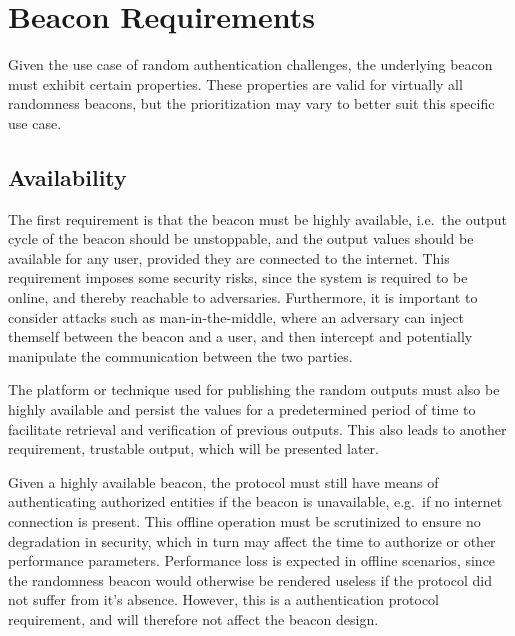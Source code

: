 \section{Beacon Requirements}
\label{sec:beacon_requirements}

Given the use case of random authentication challenges, the underlying beacon must exhibit certain properties.
These properties are valid for virtually all randomness beacons, but the prioritization may vary to better suit this specific use case.

\subsection{Availability}
The first requirement is that the beacon must be highly available, i.e.\ the output cycle of the beacon should be unstoppable,
and the output values should be available for any user, provided they are connected to the internet. %
This requirement imposes some security risks, since the system is required to be online, and thereby reachable to adversaries.
Furthermore, it is important to consider attacks such as man-in-the-middle, where an adversary can inject themself between the beacon and a user, and then intercept and potentially manipulate the communication between the two parties.

The platform or technique used for publishing the random outputs must also be highly available and persist the values for a predetermined period of time to facilitate retrieval and verification of previous outputs.
This also leads to another requirement, trustable output, which will be presented later.

Given a highly available beacon, the protocol must still have means of authenticating authorized entities if the beacon is unavailable, e.g.\ if no internet connection is present.
This offline operation must be scrutinized to ensure no degradation in security, which in turn may affect the time to authorize or other performance parameters.
Performance loss is expected in offline scenarios, since the randomness beacon would otherwise be rendered useless if the protocol did not suffer from it's absence.
However, this is a authentication protocol requirement, and will therefore not affect the beacon design.

